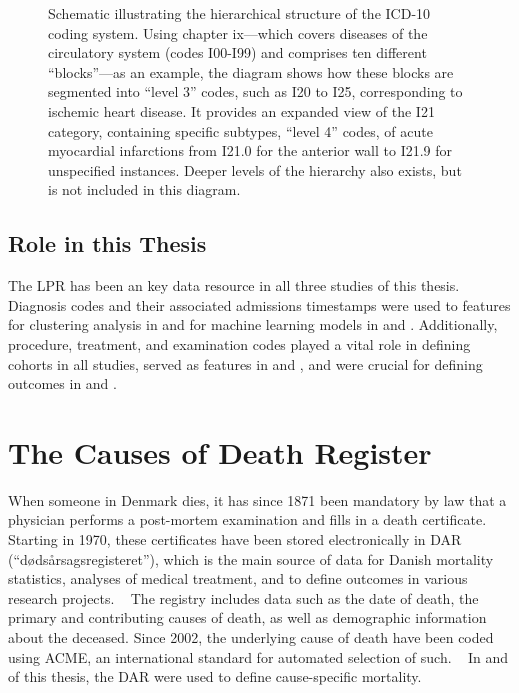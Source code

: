 \begin{figure}
\begin{tikzpicture}
\end{tikzpicture}
\caption[The ICD-10 Hierarchy]{%
    Schematic illustrating the hierarchical structure of the \ac{ICD-10} coding
    system. 
    Using chapter ix---which covers diseases of the circulatory system
    (codes I00-I99) and comprises ten different \enquote{blocks}---as an example, 
    the diagram shows how these blocks are segmented into 
    \enquote{level 3} codes, such as I20 to I25, 
    corresponding to ischemic heart disease. 
    It provides an expanded view of the I21 category, 
    containing specific subtypes, \enquote{level 4} codes, 
    of acute myocardial infarctions 
    from I21.0 for the anterior wall 
    to I21.9 for unspecified instances. 
    Deeper levels of the hierarchy also exists,
    but is not included in this diagram.
}
\label{fig:icd10-hierarchy}
\end{figure}

\subsection{Role in this Thesis}

The \ac{LPR} has been an key data resource in all three studies of this thesis. 
Diagnosis codes and their associated admissions timestamps were used to 
features for clustering analysis in \studyi{} 
and for machine learning models in \studyii{} and \studyiii{}.
Additionally, procedure, treatment, and examination codes played a vital role 
in defining cohorts in all studies, 
served as features in \studyii{} and \studyiii{},
and were crucial for defining outcomes in \studyi{} and \studyiii{}.

\section{The Causes of Death Register}

When someone in Denmark dies, 
it has since 1871 been mandatory by law that a physician
performs a post-mortem examination and fills in a death certificate.
~\autocite{helweg-larsenDanish2011}
Starting in 1970, these certificates have been stored electronically 
in \ac{DAR} (\enquote{dødsårsagsregisteret}),
which is the main source of data for 
Danish mortality statistics,
analyses of medical treatment,
and to define outcomes in various research projects.
~\autocite{helweg-larsenDanish2011}
The registry includes data such as 
the date of death, the primary and contributing causes
of death, as well as demographic information about the deceased.
Since 2002, the underlying cause of death have been coded using \ac{ACME},
an international standard for automated selection of such.
~\autocite{helweg-larsenDanish2011}
In \studyi{} and \studyiii{} of this thesis, 
the \ac{DAR} were used to define cause-specific mortality.


